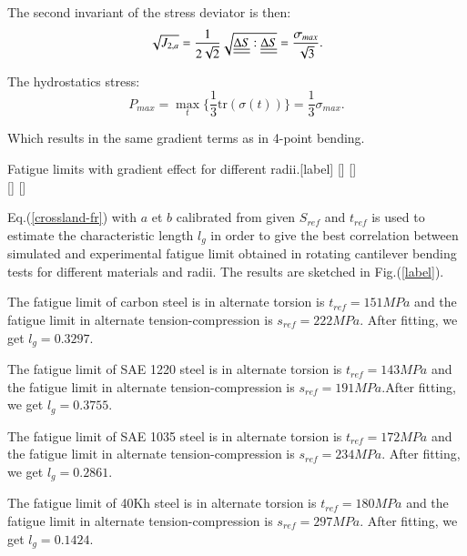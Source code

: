 \documentclass[3p,times,procedia,number]{elsarticle}
\begin{document}
The second invariant of the stress deviator is then:
\begin{equation}
\sqrt{J_{2,a}}=\frac{1}{2\sqrt{2}}\sqrt{\uline{\uline{\Delta S}}:\uline{\uline{\Delta S}}}=\frac{\sigma_{max}}{\sqrt{3}} .
\end{equation}

The hydrostatics stress:
\begin{equation}
P_{max}=\max\limits_{t}\{\frac{1}{3}\textrm{tr}(\sigma(t))\}=\frac{1}{3}\sigma_{max}.
\end{equation}

Which results in the same gradient terms as in 4-point bending.

\begin{Figure}{Fatigue limits with gradient effect for different radii.}[label]
	\\
\end{Figure}

Eq.(\ref{crossland-fr}) with $a$ et $b$ calibrated from given $S_{ref}$ and $t_{ref}$ is used to estimate the characteristic length $l_g$ in order to give the best correlation between simulated and experimental fatigue limit obtained in rotating cantilever bending tests for different materials and radii. The results are sketched in Fig.(\ref{label}).


\noindent The  fatigue limit of carbon steel is in alternate torsion is $t_{ref}=151MPa$  and the fatigue limit in alternate tension-compression is $s_{ref}=222MPa$. After fitting, we get $l_g=0.3297$.

\noindent The  fatigue limit of SAE 1220 steel is in alternate torsion is $t_{ref}=143MPa$  and the fatigue limit in alternate tension-compression is $s_{ref}=191MPa$.After fitting, we get $l_g=0.3755$.

\noindent  The  fatigue limit of SAE 1035 steel is in alternate torsion is $t_{ref}=172MPa$  and the fatigue limit in alternate tension-compression is $s_{ref}=234MPa$. After fitting, we get $l_g=0.2861$.

\noindent   The  fatigue limit of 40Kh steel is in alternate torsion is $t_{ref}=180MPa$  and the fatigue limit in alternate tension-compression is $s_{ref}=297MPa$. After fitting, we get $l_g=0.1424$.
\end{document}
